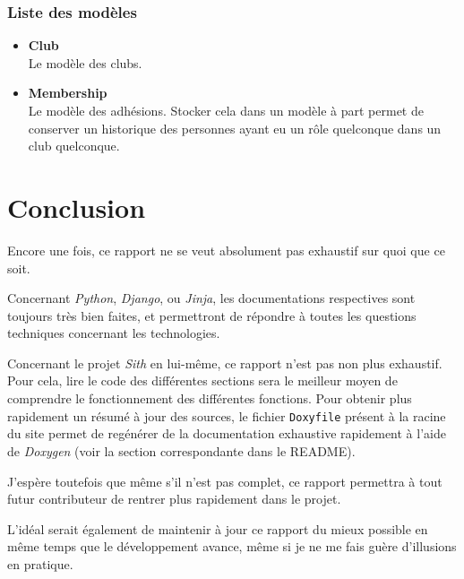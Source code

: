 \documentclass[a4paper]{report}
\begin{document}
\subsection{Liste des modèles}
\label{sub:liste_des_mod_les}
\begin{itemize}
    \item \textbf{Club} \\
        Le modèle des clubs.
    \item \textbf{Membership} \\
        Le modèle des adhésions. Stocker cela dans un modèle à part permet de conserver un historique des personnes
        ayant eu un rôle quelconque dans un club quelconque.
\end{itemize}



\chapter{Conclusion}
\par Encore une fois, ce rapport ne se veut absolument pas exhaustif sur quoi que ce soit.
\par Concernant \emph{Python}, \emph{Django}, ou \emph{Jinja}, les documentations respectives sont toujours très bien
faites, et permettront de répondre à toutes les questions techniques concernant les technologies.
\par Concernant le projet \emph{Sith} en lui-même, ce rapport n'est pas non plus exhaustif. Pour cela, lire le code des
différentes sections sera le meilleur moyen de comprendre le fonctionnement des différentes fonctions. Pour obtenir plus
rapidement un résumé à jour des sources, le fichier \verb#Doxyfile# présent à la racine du site permet de regénérer de
la documentation exhaustive rapidement à l'aide de \emph{Doxygen} (voir la section correspondante dans le README).
\par J'espère toutefois que même s'il n'est pas complet, ce rapport permettra à tout futur contributeur de rentrer plus
rapidement dans le projet.
\par L'idéal serait également de maintenir à jour ce rapport du mieux possible en même temps que le développement
avance, même si je ne me fais guère d'illusions en pratique.
\end{document}
